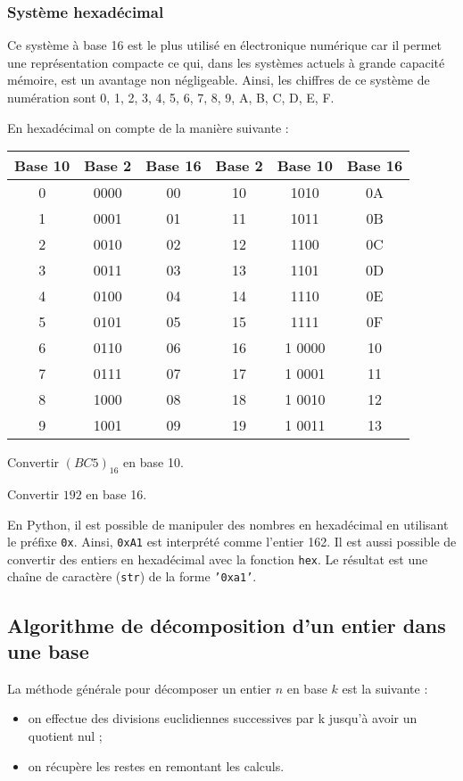 \subsubsection{Système hexadécimal}
Ce système à base 16 est le plus utilisé en électronique numérique car il permet une représentation compacte ce qui, dans les systèmes actuels à grande capacité mémoire, est un avantage non négligeable. 
Ainsi, les chiffres de ce système de numération sont 0, 1, 2, 3, 4, 5, 6, 7, 8, 9, A, B, C, D, E, F.  

\begin{exemple}
En hexadécimal on compte de la manière suivante : 
\begin{center}
\begin{tabular}{|c|c|c||c|c|c|}
\hline
Base 10 & Base 2 & Base 16 & Base 2 & Base 10 & Base 16 \\
\hline \hline
0 & 0000 & 00 & 10 & 1010 & 0A \\ \hline
1 & 0001& 01 & 11  & 1011 & 0B \\ \hline
2 & 0010& 02 & 12  & 1100 & 0C \\ \hline
3 & 0011& 03 & 13  & 1101 & 0D \\ \hline
4 & 0100& 04 & 14  & 1110 & 0E \\ \hline
5 & 0101& 05 & 15  & 1111 & 0F \\ \hline
6 & 0110& 06 & 16  & 1 0000 & 10\\ \hline
7 & 0111& 07 & 17  & 1 0001 & 11 \\ \hline
8 & 1000& 08 & 18  & 1 0010 & 12 \\ \hline
9 & 1001& 09 & 19  & 1 0011 & 13 \\ \hline
\end{tabular}
\end{center}


Convertir $\left(BC5 \right)_{16}$ en base 10.

Convertir $192$ en base 16.

\end{exemple}


En Python, il est possible de manipuler des nombres en hexadécimal en utilisant le préfixe \texttt{0x}. Ainsi, \texttt{0xA1} est interprété comme l'entier 162. 
Il est aussi possible de convertir des entiers en hexadécimal avec la fonction \texttt{hex}. Le résultat est une chaîne de caractère (\texttt{str}) de la forme \texttt{'0xa1'}.


\subsection{Algorithme de décomposition d'un entier dans une base}
\begin{methode}
La méthode générale pour décomposer un entier $n$ en base $k$ est la suivante :
\begin{itemize}
\item on effectue des divisions euclidiennes successives par k jusqu’à avoir un quotient nul ;
\item on récupère les restes en remontant les calculs.
\end{itemize}
\end{methode}

